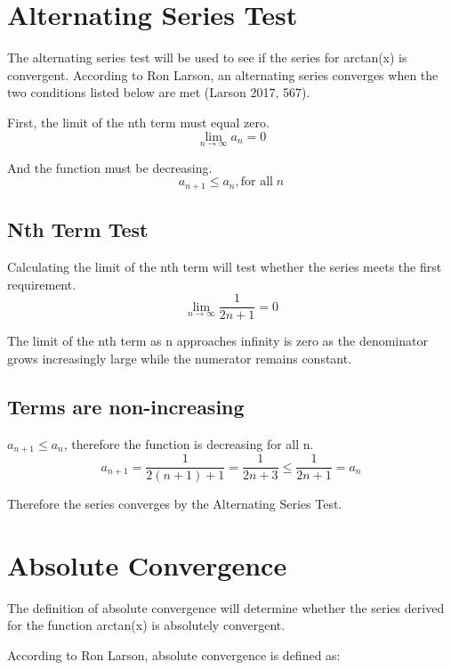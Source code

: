 \documentclass[12pt, titlepage]{article}
\begin{document}
\section{Alternating Series Test}
The alternating series test will be used to see if the series for arctan(x) is convergent. According to Ron Larson, an alternating series converges when the two conditions listed below are met (Larson 2017, 567).

First, the limit of the nth term must equal zero.
\begin{equation}
    \lim_{n \to \infty} a_{n} = 0
\end{equation}

And the function must be decreasing.
\begin{equation}
    a_{n+1} \leq a_{n}, \textrm{for all} \; n
\end{equation}

\subsection{Nth Term Test}
Calculating the limit of the nth term will test whether the series meets the first requirement.
\begin{equation}
    \lim_{n \to \infty} \frac{1}{2n+1} = 0     
\end{equation}

The limit of the nth term as n approaches infinity is zero as the denominator grows increasingly large while the numerator remains constant.

\subsection{Terms are non-increasing}
\(a_{n+1} \leq a_{n}\), therefore the function is decreasing for all n. 
\begin{equation}
    a_{n+1} = \frac{1}{2(n+1) + 1} = \frac{1}{2n+3} \leq \frac{1}{2n+1} = a_{n}
\end{equation}

Therefore the series converges by the Alternating Series Test.

\section{Absolute Convergence}
The definition of absolute convergence will determine whether the series derived for the function arctan(x) is absolutely convergent.

According to Ron Larson, absolute convergence is defined as: 
\end{document}
